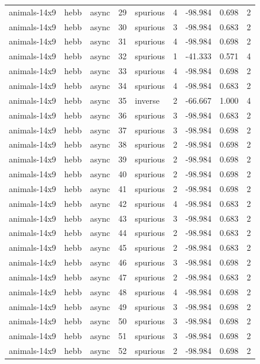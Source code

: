 \begin{tabular}{lllrlrrrr}
animals-14x9 & hebb & async & 29 & spurious & 4 & -98.984 & 0.698 & 2 \\
animals-14x9 & hebb & async & 30 & spurious & 3 & -98.984 & 0.683 & 2 \\
animals-14x9 & hebb & async & 31 & spurious & 4 & -98.984 & 0.698 & 2 \\
animals-14x9 & hebb & async & 32 & spurious & 1 & -41.333 & 0.571 & 4 \\
animals-14x9 & hebb & async & 33 & spurious & 4 & -98.984 & 0.698 & 2 \\
animals-14x9 & hebb & async & 34 & spurious & 4 & -98.984 & 0.683 & 2 \\
animals-14x9 & hebb & async & 35 & inverse & 2 & -66.667 & 1.000 & 4 \\
animals-14x9 & hebb & async & 36 & spurious & 3 & -98.984 & 0.683 & 2 \\
animals-14x9 & hebb & async & 37 & spurious & 3 & -98.984 & 0.698 & 2 \\
animals-14x9 & hebb & async & 38 & spurious & 2 & -98.984 & 0.698 & 2 \\
animals-14x9 & hebb & async & 39 & spurious & 2 & -98.984 & 0.698 & 2 \\
animals-14x9 & hebb & async & 40 & spurious & 2 & -98.984 & 0.698 & 2 \\
animals-14x9 & hebb & async & 41 & spurious & 2 & -98.984 & 0.698 & 2 \\
animals-14x9 & hebb & async & 42 & spurious & 4 & -98.984 & 0.683 & 2 \\
animals-14x9 & hebb & async & 43 & spurious & 3 & -98.984 & 0.683 & 2 \\
animals-14x9 & hebb & async & 44 & spurious & 2 & -98.984 & 0.683 & 2 \\
animals-14x9 & hebb & async & 45 & spurious & 2 & -98.984 & 0.683 & 2 \\
animals-14x9 & hebb & async & 46 & spurious & 3 & -98.984 & 0.698 & 2 \\
animals-14x9 & hebb & async & 47 & spurious & 2 & -98.984 & 0.683 & 2 \\
animals-14x9 & hebb & async & 48 & spurious & 4 & -98.984 & 0.698 & 2 \\
animals-14x9 & hebb & async & 49 & spurious & 3 & -98.984 & 0.698 & 2 \\
animals-14x9 & hebb & async & 50 & spurious & 3 & -98.984 & 0.698 & 2 \\
animals-14x9 & hebb & async & 51 & spurious & 3 & -98.984 & 0.698 & 2 \\
animals-14x9 & hebb & async & 52 & spurious & 2 & -98.984 & 0.698 & 2 \\

\end{tabular}
